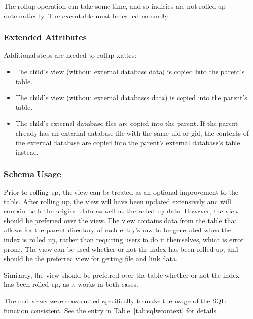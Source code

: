 The rollup operation can take some time, and so indicies are not
rolled up automatically. The \gufirollup executable must be called
manually.

\subsubsection{Extended Attributes}
Additional steps are needed to rollup xattrs:

\begin{itemize}
\item The child's \xattrsavail view (without external database data)
  is copied into the parent's \xattrsrollup table.
\item The child's \xattrfiles view (without external databases data)
  is copied into the parent's \xattrfilesrollup table.
\item The child's external database files are copied into the
  parent. If the parent already has an external database file with the
  same uid or gid, the contents of the external database are copied
  into the parent's external database's \xattrsrollup table instead.
\end{itemize}

\subsubsection{Schema Usage}
Prior to rolling up, the \pentries view can be treated as an optional
improvement to the \entries table. After rolling up, the \pentries
view will have been updated extensively and will contain both the
original \entries data as well as the rolled up data. However, the
\vrpentries view should be preferred over the \pentries view. The
\vrpentries view contains data from the \summary table that allows for
the parent directory of each entry's row to be generated when the
index is rolled up, rather than requiring users to do it themselves,
which is error prone. The \vrpentries view can be used whether or not
the index has been rolled up, and should be the preferred view for
getting file and link data.

Similarly, the \vrsummary view should be preferred over the \summary
table whether or not the index has been rolled up, as it works in both
cases.

The \vrpentries and \vrsummary views were constructed specifically to
make the usage of the \rpath SQL function consistent. See the
\rpath entry in Table~\ref{tab:sqlwcontext} for details.

